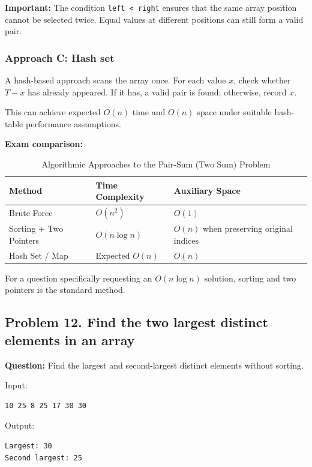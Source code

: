 \textbf{Important:} The condition \texttt{left < right} ensures that the same array position cannot be selected twice. Equal values at different positions can still form a valid pair.

\subsubsection{Approach C: Hash set}

A hash-based approach scans the array once. For each value $x$, check whether $T-x$ has already appeared. If it has, a valid pair is found; otherwise, record $x$.

This can achieve expected $O(n)$ time and $O(n)$ space under suitable hash-table performance assumptions.

\textbf{Exam comparison:}

\begin{table}[htbp]
\centering
\caption{Algorithmic Approaches to the Pair-Sum (Two Sum) Problem}
\label{tab:two_sum_comparison}
\begin{tabularx}{\textwidth}{p{4.2cm} X X}
\toprule
\textbf{Method} & \textbf{Time Complexity} & \textbf{Auxiliary Space} \\
\midrule
Brute Force & $O(n^2)$ & $O(1)$ \\
Sorting + Two Pointers & $O(n \log n)$ & $O(n)$ when preserving original indices \\
Hash Set / Map & Expected $O(n)$ & $O(n)$ \\
\bottomrule
\end{tabularx}
\end{table}

For a question specifically requesting an $O(n\log n)$ solution, sorting and two pointers is the standard method.

\subsection{Problem 12. Find the two largest distinct elements in an array}

\textbf{Question:} Find the largest and second-largest distinct elements without sorting.

Input:

\begin{lstlisting}[style=pseudocode]
10 25 8 25 17 30 30
\end{lstlisting}

Output:

\begin{lstlisting}[style=pseudocode]
Largest: 30
Second largest: 25
\end{lstlisting}

